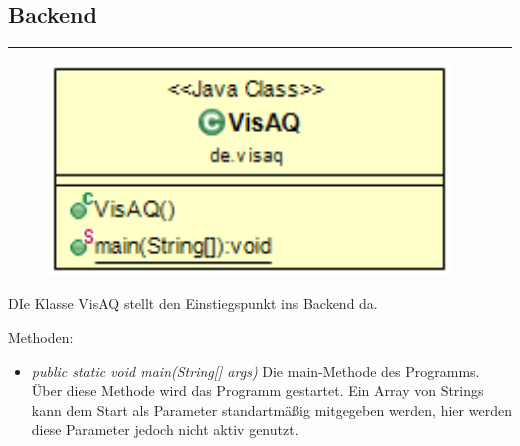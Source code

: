 \subsection{Backend}
\rule{\textwidth}{0.4pt}
\begin{minipage}{0.4\textwidth}
    \begin{figure}[H]
        {\centering\includegraphics[width=0.95\textwidth]{media/backend/classes/VisAQ.png}}
    \end{figure}
    \end{minipage} \hfill
\begin{minipage}{0.6\textwidth}
    DIe Klasse VisAQ stellt den Einstiegspunkt ins Backend da.
\end{minipage}

Methoden:
\begin{itemize}
    \item \emph{public static void main(String[] args)} Die main-Methode des Programms.
    Über diese Methode wird das Programm gestartet. Ein Array von Strings kann dem Start als Parameter standartmäßig mitgegeben werden, hier werden diese Parameter jedoch nicht aktiv genutzt.
\end{itemize}


